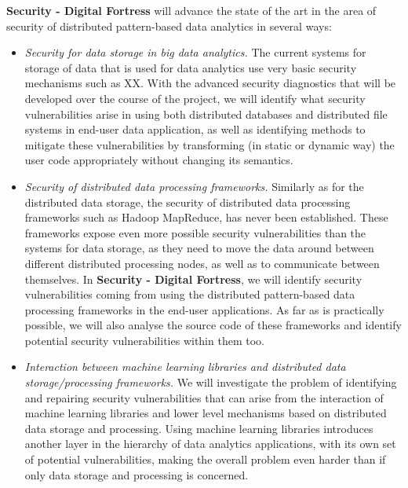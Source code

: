 \documentclass[a4paper,11pt]{article}
\newcommand{\project}[1]{\textbf{#1}\xspace}
\newcommand{\SECURITY}{\project{Security - Digital Fortress}}
\newcommand{\TheProject}{\SECURITY}
\begin{document}
\begin{mdframed}[backgroundcolor=gray!10]
\TheProject{} will advance the state of the art in the area of security of distributed pattern-based data analytics in several ways:
\begin{itemize}
\item \emph{Security for data storage in big data analytics.} The current systems for storage of data that is used for data analytics use very basic security mechanisms such as XX. With the advanced security diagnostics that will be developed over the course of the project, we will identify what security vulnerabilities arise in using both distributed databases and distributed file systems in end-user data application, as well as identifying methods to mitigate these vulnerabilities by transforming (in static or dynamic way) the user code appropriately without changing its semantics. 
\item \emph{Security of distributed data processing frameworks.} Similarly as for the distributed data storage, the security of distributed data processing frameworks such as Hadoop MapReduce, has never been established. These frameworks expose even more possible security vulnerabilities than the systems for data storage, as they need to move the data around between different distributed processing nodes, as well as to communicate between themselves. In \TheProject{}, we will identify security vulnerabilities coming from using the distributed pattern-based data processing frameworks in the end-user applications. As far as is practically possible, we will also analyse the source code of these frameworks and identify potential security vulnerabilities within them too.
\item \emph{Interaction between machine learning libraries and distributed data storage/processing frameworks.} We will investigate the problem of identifying and repairing security vulnerabilities that can arise from the interaction of machine learning libraries and lower level mechanisms based on distributed data storage and processing. Using machine learning libraries introduces another layer in the hierarchy of data analytics applications, with its own set of potential vulnerabilities, making the overall problem even harder than if only data storage and processing is concerned. 
\end{itemize}
\end{mdframed}
\end{document}
